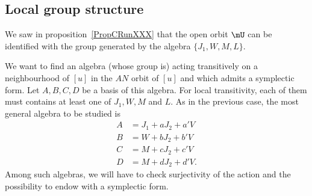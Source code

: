 \subsection{Local group structure}

We saw in proposition~\ref{PropCRunXXX} that the open orbit $\mU$ can be identified with the group generated by the algebra $\{ J_{1},W,M,L \}$.

We want to find an algebra (whose group is) acting transitively on a neighbourhood of $[u]$ in the $AN$ orbit of $[u]$ and which admits a symplectic form. Let $A,B,C,D$ be a basis of this algebra. For local transitivity, each of them must contains at least one of $J_{1},W,M$ and $L$. As in the previous case, the most general algebra to be studied is
\begin{subequations}   \label{EqAlgGEnennsy}
\begin{align}
 A&=J_{1}+aJ_{2}+a'V\\
 B&=W+bJ_{2}+b'V\\
 C&=M+cJ_{2}+c'V\\
 D&=M+dJ_{2}+d'V.
\end{align}
\end{subequations}
Among such algebras, we will have to check surjectivity of the action and the possibility to endow with a symplectic form.

